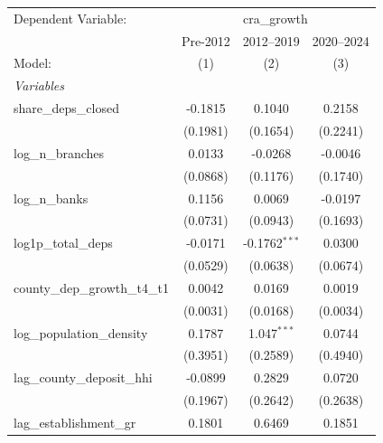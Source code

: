 \begingroup
\centering
\begin{tabular}{lccc}
   \tabularnewline \midrule \midrule
   Dependent Variable: & \multicolumn{3}{c}{cra\_growth}\\
                                                  & Pre-2012        & 2012–2019       & 2020–2024 \\   
   Model:                                         & (1)             & (2)             & (3)\\  
   \midrule
   \emph{Variables}\\
   share\_deps\_closed                            & -0.1815         & 0.1040          & 0.2158\\   
                                                  & (0.1981)        & (0.1654)        & (0.2241)\\   
   log\_n\_branches                               & 0.0133          & -0.0268         & -0.0046\\   
                                                  & (0.0868)        & (0.1176)        & (0.1740)\\   
   log\_n\_banks                                  & 0.1156          & 0.0069          & -0.0197\\   
                                                  & (0.0731)        & (0.0943)        & (0.1693)\\   
   log1p\_total\_deps                             & -0.0171         & -0.1762$^{***}$ & 0.0300\\   
                                                  & (0.0529)        & (0.0638)        & (0.0674)\\   
   county\_dep\_growth\_t4\_t1                    & 0.0042          & 0.0169          & 0.0019\\   
                                                  & (0.0031)        & (0.0168)        & (0.0034)\\   
   log\_population\_density                       & 0.1787          & 1.047$^{***}$   & 0.0744\\   
                                                  & (0.3951)        & (0.2589)        & (0.4940)\\   
   lag\_county\_deposit\_hhi                      & -0.0899         & 0.2829          & 0.0720\\   
                                                  & (0.1967)        & (0.2642)        & (0.2638)\\   
   lag\_establishment\_gr                         & 0.1801          & 0.6469          & 0.1851\\   

\end{tabular}

